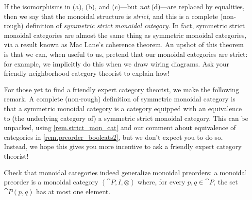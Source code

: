 \documentclass[7Sketches]{subfiles}
\begin{document}
\begin{remark} %
\label{rem.strict_mon_cat}%
If the isomorphisms in (a), (b), and (c)---but 
\emph{not} (d)---are replaced by equalities, then we say that the monoidal
structure is \emph{strict}, and this is a complete (non-rough) definition of
\emph{symmetric strict monoidal category}. In fact, symmetric strict monoidal
categories are almost the same thing as symmetric monoidal categories, via a
result known as Mac Lane's coherence theorem. An upshot of this theorem is that
we can, when useful to us, pretend that our monoidal categories are strict: for
example, we implicitly do this when we draw wiring diagrams. Ask your friendly
neighborhood category theorist to explain how! 
\end{remark}

\begin{remark}
For those yet to find a friendly expert category theorist, we make the following
remark. A complete (non-rough) definition of symmetric monoidal category is that
a symmetric monoidal category is a category equipped with an equivalence to
(the underlying category of) a symmetric strict monoidal category. This can be
unpacked, using \cref{rem.strict_mon_cat} and our comment about equivalence of
categories in \cref{rem.preorder_boolcats2}, but we don't expect you to do
so. Instead, we hope this gives you more incentive to ask a friendly expert
category theorist!
\end{remark}

\begin{exercise} %
\label{exc.mon_preorder_is_cat}%
Check that monoidal categories indeed generalize monoidal preorders: a monoidal preorder is a
monoidal category $(\cat{P},I,\otimes)$ where, for every $p,q\in\cat{P}$, the
set $\cat{P}(p,q)$ has at most one element. 
\end{exercise}
\end{document}
